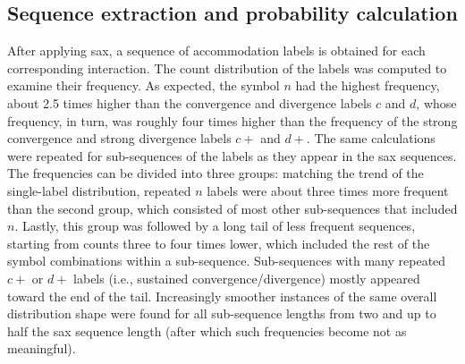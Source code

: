 \subsection{Sequence extraction and probability calculation}
\label{subsec:word_extraction_and_seq_prob}


After applying \ac{sax}, a sequence of accommodation labels is obtained for each corresponding interaction.
The count distribution of the labels was computed to examine their frequency.
As expected, the symbol $n$ had the highest frequency, about 2.5 times higher than the convergence and divergence labels $c$ and $d$, whose frequency, in turn, was roughly four times higher than the frequency of the strong convergence and strong divergence labels $c+$ and $d+$.
The same calculations were repeated for sub-sequences of the labels as they appear in the \ac{sax} sequences.
The frequencies can be divided into three groups: matching the trend of the single-label distribution, repeated $n$ labels were about three times more frequent than the second group, which consisted of most other sub-sequences that included $n$.
Lastly, this group was followed by a long tail of less frequent sequences, starting from counts three to four times lower, which included the rest of the symbol combinations within a sub-sequence.
Sub-sequences with many repeated $c+$ or $d+$ labels (i.e., sustained convergence/divergence) mostly appeared toward the end of the tail.
Increasingly smoother instances of the same overall distribution shape were found for all sub-sequence lengths from two and up to half the \ac{sax} sequence length (after which such frequencies become not as meaningful).

